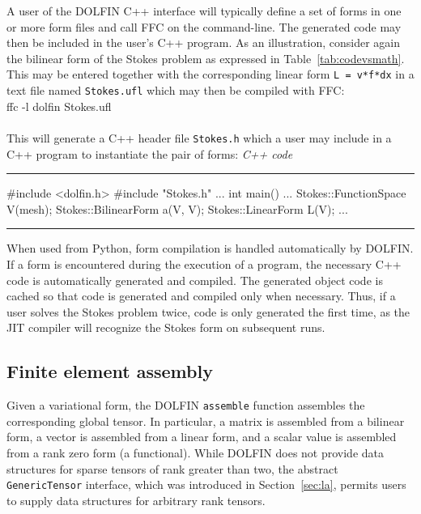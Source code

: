 \documentclass[acmtoms]{acmtrans2m}
\newenvironment{code}[1]{\center\tabular{c}\hline\\ \footnotesize\minipage{#1\textwidth}\verbatim}{\endverbatim\endminipage\\ \\ \hline\endtabular\endcenter}
\newenvironment{cppcode}[1]{\center\minipage{#1\textwidth}\footnotesize\hfill\it C++ code \rm\vspace{0.1cm}\hrule\renewcommand{\baselinestretch}{0.9}\footnotesize\verbatim}{\endverbatim\hrule\normalsize\endminipage\newline\endcenter}
\newcommand{\emp}[1]{\texttt{#1}}
\newcommand{\dolfin}{DOLFIN}
\begin{document}
A user of the \dolfin{} C++ interface will typically define a set of
forms in one or more form files and call FFC on the command-line. The
generated code may then be included in the user's C++ program. As an
illustration, consider again the bilinear form of the Stokes problem
as expressed in Table~\ref{tab:codevsmath}. This may be entered
together with the corresponding linear form \emp{L = v*f*dx} in a text
file named \emp{Stokes.ufl} which may then be compiled with FFC:
\begin{code}{0.9}
ffc -l dolfin Stokes.ufl
\end{code}
This will generate a C++ header file \emp{Stokes.h} which a user may
include in a C++ program to instantiate the pair of forms:
\begin{cppcode}{0.9}
#include <dolfin.h>
#include "Stokes.h"
...
int main()
{
  ...
  Stokes::FunctionSpace V(mesh);
  Stokes::BilinearForm a(V, V);
  Stokes::LinearForm L(V);
  ...
}
\end{cppcode}
When used from Python, form compilation is handled automatically by
\dolfin{}. If a form is encountered during the execution of a program,
the necessary C++ code is automatically generated and compiled. The
generated object code is cached so that code is generated and compiled
only when necessary. Thus, if a user solves the Stokes problem twice,
code is only generated the first time, as the JIT compiler will
recognize the Stokes form on subsequent runs.

\subsection{Finite element assembly}

Given a variational form, the \dolfin{} \emp{assemble} function
assembles the corresponding global tensor. In particular, a matrix is
assembled from a bilinear form, a vector is assembled from a linear
form, and a scalar value is assembled from a rank zero form (a
functional). While \dolfin{} does not provide data structures for
sparse tensors of rank greater than two, the abstract
\emp{GenericTensor} interface, which was
introduced in Section~\ref{sec:la},
permits users to supply data  structures for arbitrary rank tensors.
\end{document}
